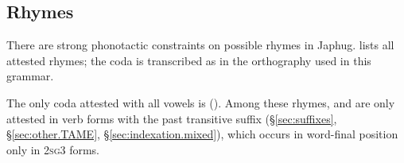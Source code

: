 \subsection{Rhymes} \label{sec:rhyme.inventory}
There are strong phonotactic constraints on possible rhymes in Japhug.  lists all attested rhymes; the coda  is transcribed as  in the orthography used in this grammar.

\begin{table}
	\caption{List of possible rhymes in Japhug} \label{tab:rhymes} 
\end{table}

The only coda attested with all  vowels is  (). Among these rhymes,  and  are only attested in verb forms with the past transitive  suffix (§\ref{sec:suffixes}, §\ref{sec:other.TAME}, §\ref{sec:indexation.mixed}), which occurs in word-final position only in \textsc{2sg}\fl{}3  forms.

